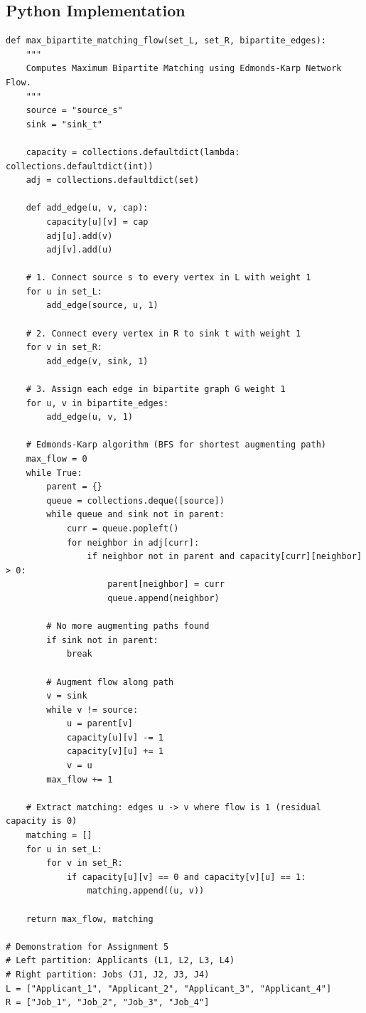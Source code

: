 \documentclass[12pt]{article}
\begin{document}
\subsection*{Python Implementation}
\begin{lstlisting}[style=code]
def max_bipartite_matching_flow(set_L, set_R, bipartite_edges):
    """
    Computes Maximum Bipartite Matching using Edmonds-Karp Network Flow.
    """
    source = "source_s"
    sink = "sink_t"

    capacity = collections.defaultdict(lambda: collections.defaultdict(int))
    adj = collections.defaultdict(set)

    def add_edge(u, v, cap):
        capacity[u][v] = cap
        adj[u].add(v)
        adj[v].add(u)

    # 1. Connect source s to every vertex in L with weight 1
    for u in set_L:
        add_edge(source, u, 1)

    # 2. Connect every vertex in R to sink t with weight 1
    for v in set_R:
        add_edge(v, sink, 1)

    # 3. Assign each edge in bipartite graph G weight 1
    for u, v in bipartite_edges:
        add_edge(u, v, 1)

    # Edmonds-Karp algorithm (BFS for shortest augmenting path)
    max_flow = 0
    while True:
        parent = {}
        queue = collections.deque([source])
        while queue and sink not in parent:
            curr = queue.popleft()
            for neighbor in adj[curr]:
                if neighbor not in parent and capacity[curr][neighbor] > 0:
                    parent[neighbor] = curr
                    queue.append(neighbor)

        # No more augmenting paths found
        if sink not in parent:
            break

        # Augment flow along path
        v = sink
        while v != source:
            u = parent[v]
            capacity[u][v] -= 1
            capacity[v][u] += 1
            v = u
        max_flow += 1

    # Extract matching: edges u -> v where flow is 1 (residual capacity is 0)
    matching = []
    for u in set_L:
        for v in set_R:
            if capacity[u][v] == 0 and capacity[v][u] == 1:
                matching.append((u, v))

    return max_flow, matching

# Demonstration for Assignment 5
# Left partition: Applicants (L1, L2, L3, L4)
# Right partition: Jobs (J1, J2, J3, J4)
L = ["Applicant_1", "Applicant_2", "Applicant_3", "Applicant_4"]
R = ["Job_1", "Job_2", "Job_3", "Job_4"]


\end{lstlisting}
\end{document}
